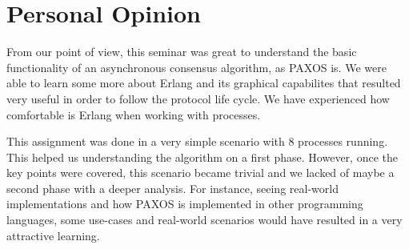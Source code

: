 \section{Personal Opinion}
\label{sec:PersonalOpinion}

From our point of view, this seminar was great to understand the basic functionality
of an asynchronous consensus algorithm, as PAXOS is. We were able to learn some more about 
Erlang and its graphical capabilites that resulted very useful in order to follow the protocol life
cycle. We have experienced how comfortable is Erlang when working with processes.

This assignment was done in a very simple scenario with 8 processes running. This helped
us understanding the algorithm on a first phase. However, once the key points were covered,
this scenario became trivial and we lacked of maybe a second phase with a deeper analysis.
For instance, seeing real-world implementations and how PAXOS is implemented in other programming 
languages, some use-cases and real-world scenarios would have resulted in a very attractive learning.
